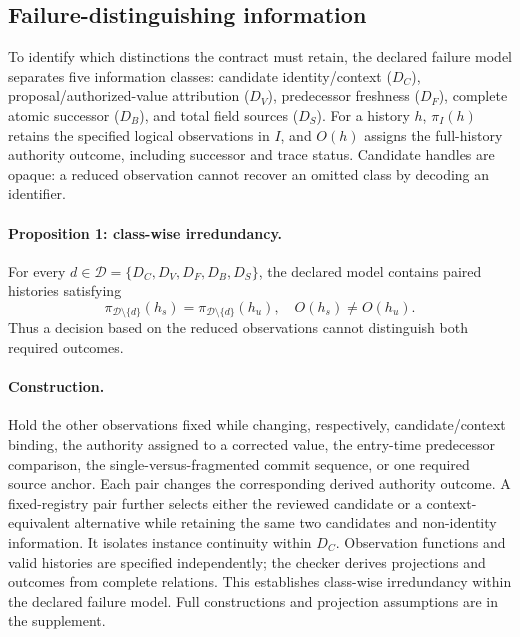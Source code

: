 \documentclass[10pt,a4paper,twocolumn]{article}
\begin{document}
\subsection{Failure-distinguishing information}
To identify which distinctions the contract must retain, the declared failure model separates five information classes: candidate identity/context ($D_C$), proposal/authorized-value attribution ($D_V$), predecessor freshness ($D_F$), complete atomic successor ($D_B$), and total field sources ($D_S$). For a history $h$, $\pi_I(h)$ retains the specified logical observations in $I$, and $O(h)$ assigns the full-history authority outcome, including successor and trace status. Candidate handles are opaque: a reduced observation cannot recover an omitted class by decoding an identifier.

\paragraph{Proposition 1: class-wise irredundancy.}
For every $d\in\mathcal D=\{D_C,D_V,D_F,D_B,D_S\}$, the declared model contains paired histories satisfying
\begin{equation}
\pi_{\mathcal D\setminus\{d\}}(h_s)=\pi_{\mathcal D\setminus\{d\}}(h_u),
\quad O(h_s)\ne O(h_u).
\end{equation}
Thus a decision based on the reduced observations cannot distinguish both required outcomes.

\paragraph{Construction.}
Hold the other observations fixed while changing, respectively, candidate/context binding, the authority assigned to a corrected value, the entry-time predecessor comparison, the single-versus-fragmented commit sequence, or one required source anchor. Each pair changes the corresponding derived authority outcome. A fixed-registry pair further selects either the reviewed candidate or a context-equivalent alternative while retaining the same two candidates and non-identity information. It isolates instance continuity within $D_C$. Observation functions and valid histories are specified independently; the checker derives projections and outcomes from complete relations. This establishes class-wise irredundancy within the declared failure model. Full constructions and projection assumptions are in the supplement.
\end{document}
